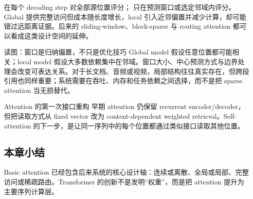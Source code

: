  在每个 decoding step 对全部源位置评分； 只在预测窗口或选定邻域内评分。Global 提供完整访问但成本随长度增长，local 引入近邻偏置并减少计算，却可能错过远距离证据。后来的 sliding-window、block-sparse 与 routing attention 都可以看成这类设计空间的延伸。


\begin{knowledgebox}{读图：窗口是归纳偏置，不只是优化技巧}
Global model 假设任意位置都可能相关；local model 假设大多数依赖集中在邻域。窗口大小、中心预测方式与边界处理会改变可表达关系。对于长文档、音频或视频，局部结构往往真实存在，但跨段引用也同样重要；系统需要在吞吐、内存和任务依赖之间选择，而不是把 sparse attention 当无损替代。
\end{knowledgebox}

\begin{importantbox}{Attention 的第一次接口重构}
早期 attention 仍保留 recurrent encoder/decoder，但把读取方式从 fixed vector 改为 content-dependent weighted retrieval。Self-attention 的下一步，是让同一序列中的每个位置都通过类似接口读取其他位置。
\end{importantbox}

\subsection{本章小结}

Basic attention 已经包含后来系统的核心设计轴：连续或离散、全局或局部、完整访问或稀疏路由。Transformer 的创新不是发明“权重”，而是把 attention 提升为主要序列计算层。

